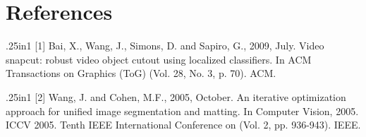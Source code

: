 \documentclass[15pt]{article}
\begin{document}


\section*{References}
\small
\begin{hangparas}{.25in}{1}
[1] Bai, X., Wang, J., Simons, D. and Sapiro, G., 2009, July. Video snapcut: robust video object cutout using localized classifiers. In ACM Transactions on Graphics (ToG) (Vol. 28, No. 3, p. 70). ACM.
\end{hangparas}

\begin{hangparas}{.25in}{1}
[2] Wang, J. and Cohen, M.F., 2005, October. An iterative optimization approach for unified image segmentation and matting. In Computer Vision, 2005. ICCV 2005. Tenth IEEE International Conference on (Vol. 2, pp. 936-943). IEEE.
\end{hangparas}
\end{document}
